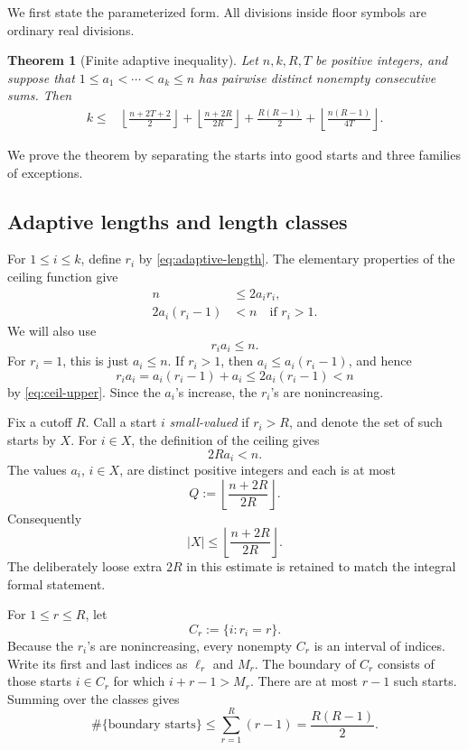 \documentclass[11pt]{article}
\numberwithin{equation}{section}
\newtheorem{theorem}{Theorem}[section]
\theoremstyle{remark}
\newcommand{\floor}[1]{\left\lfloor #1\right\rfloor}
\begin{document}
We first state the parameterized form.  All divisions inside floor
symbols are ordinary real divisions.

\begin{theorem}[Finite adaptive inequality]
\label{thm:finite}
Let \(n,k,R,T\) be positive integers, and suppose that
\(1\leq a_1<\cdots<a_k\leq n\) has pairwise distinct nonempty
consecutive sums.  Then
\begin{align}
  k\leq {}&
  \floor{\frac{n+2T+2}{2}}
  +\floor{\frac{n+2R}{2R}}
  +\frac{R(R-1)}{2}
  +\floor{\frac{n(R-1)}{4T}}.
  \label{eq:finite-bound}
\end{align}
\end{theorem}

We prove the theorem by separating the starts into good starts and
three families of exceptions.

\subsection{Adaptive lengths and length classes}

For \(1\leq i\leq k\), define \(r_i\) by
\eqref{eq:adaptive-length}.  The elementary properties of the ceiling
function give
\begin{align}
  n&\leq 2a_i r_i, \label{eq:ceil-lower}\\
  2a_i(r_i-1)&<n \quad\text{if \(r_i>1\)}.
  \label{eq:ceil-upper}
\end{align}
We will also use
\begin{equation}
  r_i a_i\leq n.
  \label{eq:base-upper}
\end{equation}
For \(r_i=1\), this is just \(a_i\leq n\).  If \(r_i>1\), then
\(a_i\leq a_i(r_i-1)\), and hence
\[
  r_i a_i=a_i(r_i-1)+a_i
  \leq 2a_i(r_i-1)<n
\]
by \eqref{eq:ceil-upper}.  Since the \(a_i\)'s increase, the \(r_i\)'s
are nonincreasing.

Fix a cutoff \(R\).  Call a start \(i\) \emph{small-valued} if
\(r_i>R\), and denote the set of such starts by \(X\).
For \(i\in X\), the definition of the ceiling gives
\[
  2Ra_i<n.
\]
The values \(a_i\), \(i\in X\), are distinct positive integers and
each is at most
\[
  Q:=\floor{\frac{n+2R}{2R}}.
\]
Consequently
\begin{equation}
  |X|\leq \floor{\frac{n+2R}{2R}}.
  \label{eq:small-count}
\end{equation}
The deliberately loose extra \(2R\) in this estimate is retained to
match the integral formal statement.

For \(1\leq r\leq R\), let
\[
  C_r:=\{i:r_i=r\}.
\]
Because the \(r_i\)'s are nonincreasing, every nonempty \(C_r\) is an
interval of indices.  Write its first and last indices as
\(\ell_r\) and \(M_r\).  The boundary of \(C_r\) consists of those
starts \(i\in C_r\) for which \(i+r-1>M_r\).  There are at most
\(r-1\) such starts.  Summing over the classes gives
\begin{equation}
  \#\{\text{boundary starts}\}
  \leq \sum_{r=1}^{R}(r-1)
  =\frac{R(R-1)}2.
  \label{eq:boundary-count}
\end{equation}
\end{document}

